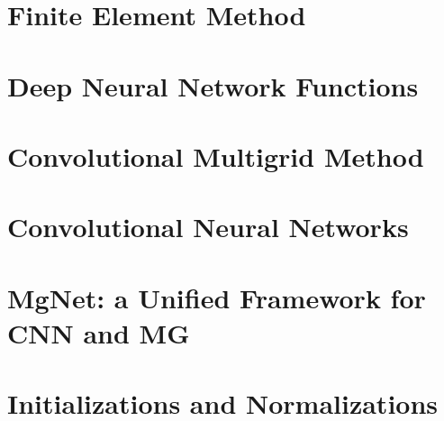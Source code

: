 \documentclass[leqno,labelfig,psfigt,colorlinks]{svmono}
\begin{document}
\chapter{Finite Element Method}



\chapter{Deep Neural Network Functions}





\chapter{Convolutional Multigrid Method}

















\chapter{Convolutional Neural Networks}





\chapter{MgNet: a Unified Framework for CNN and MG}






\chapter{Initializations and Normalizations}





\end{document}
